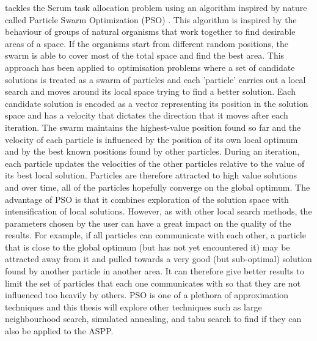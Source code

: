 \citet{brezovcnik2018scrum} tackles the Scrum task allocation problem using an algorithm inspired by nature called Particle Swarm Optimization (PSO) \citep{eberhart1995particle}. This algorithm is inspired by the behaviour of groups of natural organisms that work together to find desirable areas of a space. If the organisms start from different random positions, the swarm is able to cover most of the total space and find the best area. This approach has been applied to optimisation problems where a set of candidate solutions is treated as a swarm of particles and each 'particle' carries out a local search and moves around its local space trying to find a better solution. Each candidate solution is encoded as a vector representing its position in the solution space and has a velocity that dictates the direction that it moves after each iteration. The swarm maintains the highest-value position found so far and the velocity of each particle is influenced by the position of its own local optimum and by the best known positions found by other particles. During an iteration, each particle updates the velocities of the other particles relative to the value of its best local solution. Particles are therefore attracted to high value solutions and over time, all of the particles hopefully converge on the global optimum. The advantage of PSO is that it combines exploration of the solution space with intensification of local solutions. However, as with other local search methods, the parameters chosen by the user can have a great impact on the quality of the results. For example, if all particles can communicate with each other, a particle that is close to the global optimum (but has not yet encountered it) may be attracted away from it and pulled towards a very good (but sub-optimal) solution found by another particle in another area. It can therefore give better results to limit the set of particles that each one communicates with so that they are not influenced too heavily by others. PSO is one of a plethora of approximation techniques and this thesis will explore other techniques such as large neighbourhood search, simulated annealing, and tabu search to find if they can also be applied to the ASPP.

